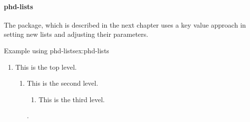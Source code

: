 \lorem


\egroup
\paragraph{phd-lists} The package, which is described in the next chapter uses a key value approach in setting new lists
and adjusting their parameters.

\begin{texexample}{Example using phd-lists}{ex:phd-lists}

 
 \begin{enumerate}
   \item This is the top level. \lorem
      \begin{enumerate}
        \item This is the second level. \lorem
          \begin{enumerate}
            \item This is the third level. \lorem
          \end{enumerate}. 
      \end{enumerate}
 \end{enumerate}
\end{texexample}

\vfill
\endinput

\section{Creating new description like environments}

The macro \docAuxCmd*{NewDescriptionEnvironment} can be used to redefine new description like environments, using a key value interface.

%
%
%
%
%
%



